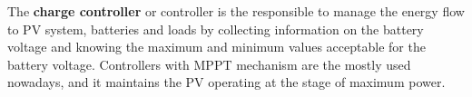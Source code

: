 %
%
%
%

The \textbf{charge controller} or controller is the responsible to manage the energy flow to PV system, batteries and loads by collecting information on the battery voltage and knowing the maximum and minimum values acceptable for the battery voltage. Controllers with MPPT mechanism are the mostly used nowadays,  and it maintains the PV operating at the stage of maximum power. %
%
%
%
%
%

